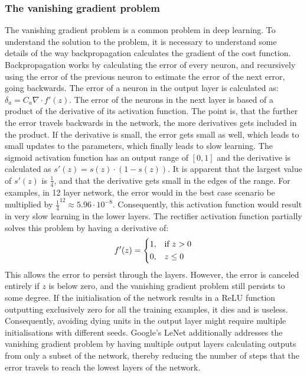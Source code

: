 \subsubsection{The vanishing gradient problem}
\label{sec:vanishinggradient}
The vanishing gradient problem is a common problem in deep learning. To understand the solution to the problem, it is necessary to understand some details of the way backpropagation calculates the gradient of the cost function.
Backpropagation works by calculating the error of every neuron, and recursively using the error of the previous neuron to estimate the error of the next error, going backwards. The error of a neuron in the output layer is calculated as: ${\delta}_a = C_a \nabla \cdot f'(z)$. The error of the neurons in the next layer is based of a product of the derivative of its activation function. The point is, that the further the error travels backwards in the network, the more derivatives gets included in the product. If the derivative is small, the error gets small as well, which leads to small updates to the parameters, which finally leads to slow learning. The sigmoid activation function has an output range of $[0,1]$ and the derivative is calculated as $s'(z) = s(z) \cdot (1-s(z))$. It is apparent that the largest value of $s'(z)$ is $\frac{1}{4}$, and that the derivative gets small in the edges of the range. For examples, in 12 layer network, the error would in the best case scenario be multiplied by ${\frac{1}{4}}^{12} \approx 5.96 \cdot 10^{-8}$. Consequently, this activation function would result in very slow learning in the lower layers. The rectifier activation function partially solves this problem by having a derivative of:
\[
    f'(z) =  
\begin{dcases}
    1,& \text{if } z > 0\\
    0,              & z \leq 0
\end{dcases}
\]
This allows the error to persist through the layers. However, the error is canceled entirely if $z$ is below zero, and the vanishing gradient problem still persists to some degree. If the initialisation of the network results in a ReLU function outputting exclusively zero for all the training examples, it dies and is useless. Consequently, avoiding dying units in the output layer might require multiple initialisations with different seeds. Google's LeNet \cite{christian} additionally addresses the vanishing gradient problem by having multiple output layers calculating outputs from only a subset of the network, thereby reducing the number of steps that the error travels to reach the lowest layers of the network.

